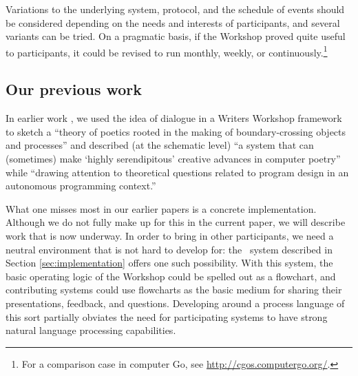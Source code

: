 Variations to the underlying system, protocol, and the schedule of
events should be considered depending on the needs and interests of
participants, and several variants can be tried.  On a pragmatic
basis, if the Workshop proved quite useful to participants, it could
be revised to run monthly, weekly, or continuously.\footnote{For a
  comparison case in computer Go, see
  \url{http://cgos.computergo.org/}.}

\subsection{Our previous work}

In earlier work \cite{corneli15iccc,corneli15cc}, we used the idea of
dialogue in a Writers Workshop framework to sketch a ``theory of
poetics rooted in the making of boundary-crossing objects and
processes'' and described (at the schematic level) ``a system that can
(sometimes) make `highly serendipitous' creative advances in computer
poetry'' while ``drawing attention to theoretical questions related to
program design in an autonomous programming context.''

What one misses most in our earlier papers is a concrete
implementation.  Although we do not fully make up for this in the
current paper, we will describe work that is now underway.  In order
to bring in other participants, we need a neutral environment that is
not hard to develop for: the \Fw\ system described in Section
\ref{sec:implementation} offers one such possibility.  With this
system, the basic operating logic of the Workshop could be spelled out
as a flowchart, and contributing systems could use flowcharts as the
basic medium for sharing their presentations, feedback, and questions.
Developing around a process language of this sort partially obviates
the need for participating systems to have strong natural language
processing capabilities.



